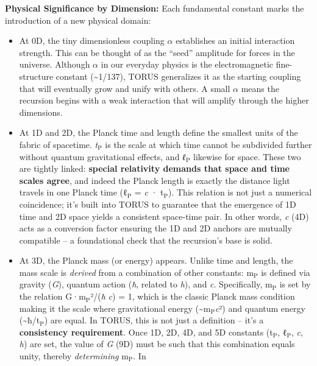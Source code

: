 \documentclass[]{article}
\newcommand{\subscript}[1]{\ensuremath{_{\mathrm{#1}}}}
\begin{document}
\textbf{Physical Significance by Dimension:} Each fundamental constant
marks the introduction of a new physical domain:

\begin{itemize}
\item
  At 0D, the tiny dimensionless coupling $\alpha$ establishes an initial
  interaction strength. This can be thought of as the ``seed'' amplitude
  for forces in the universe. Although $\alpha$ in our everyday physics is the
  electromagnetic fine-structure constant (\textasciitilde{}1/137),
  TORUS generalizes it as the starting coupling that will eventually
  grow and unify with others. A small $\alpha$ means the recursion begins with
  a weak interaction that will amplify through the higher dimensions.
\item
  At 1D and 2D, the Planck time and length define the smallest units of
  the fabric of spacetime.
  \emph{t\subscript{P}} is
  the scale at which time cannot be subdivided further without quantum
  gravitational effects, and
  \emph{ℓ\subscript{P}}
  likewise for space. These two are tightly linked: \textbf{special
  relativity demands that space and time scales agree}, and indeed the
  Planck length is exactly the distance light travels in one Planck time
  (ℓ\subscript{P} =
  \emph{c} ·
  t\subscript{P})​. This
  relation is not just a numerical coincidence; it's built into TORUS to
  guarantee that the emergence of 1D time and 2D space yields a
  consistent space-time pair. In other words, \emph{c} (4D) acts as a
  conversion factor ensuring the 1D and 2D anchors are mutually
  compatible -- a foundational check that the recursion's base is solid.
\item
  At 3D, the Planck mass (or energy) appears. Unlike time and length,
  the mass scale is \emph{derived} from a combination of other
  constants: m\subscript{P}
  is defined via gravity (\emph{G}), quantum action (\emph{ħ}, related
  to \emph{h}), and \emph{c}. Specifically,
  m\subscript{P} is set by
  the relation
  G·m\subscript{P}²/(\emph{ħ}
  \emph{c}) = 1, which is the classic Planck mass condition making it
  the scale where gravitational energy
  (\textasciitilde{}m\subscript{P}\emph{c}²)
  and quantum energy
  (\textasciitilde{}ħ/t\subscript{P})
  are equal. In TORUS, this is not just a definition -- it's a
  \textbf{consistency requirement}. Once 1D, 2D, 4D, and 5D constants
  (t\subscript{P},
  ℓ\subscript{P}, \emph{c},
  \emph{h}) are set, the value of \emph{G} (9D) must be such that this
  combination equals unity​, thereby \emph{determining}
  m\subscript{P}. In

\end{itemize}
\end{document}
